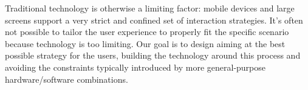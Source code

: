 


Traditional technology is otherwise a limiting factor: mobile devices and large screens support a very strict and confined set of interaction strategies. It's often not possible to tailor the user experience to properly fit the specific scenario because technology is too limiting.
Our goal is to design aiming at the best possible strategy for the users, building the technology around this process and avoiding the constraints typically introduced by more general-purpose hardware/software combinations.

